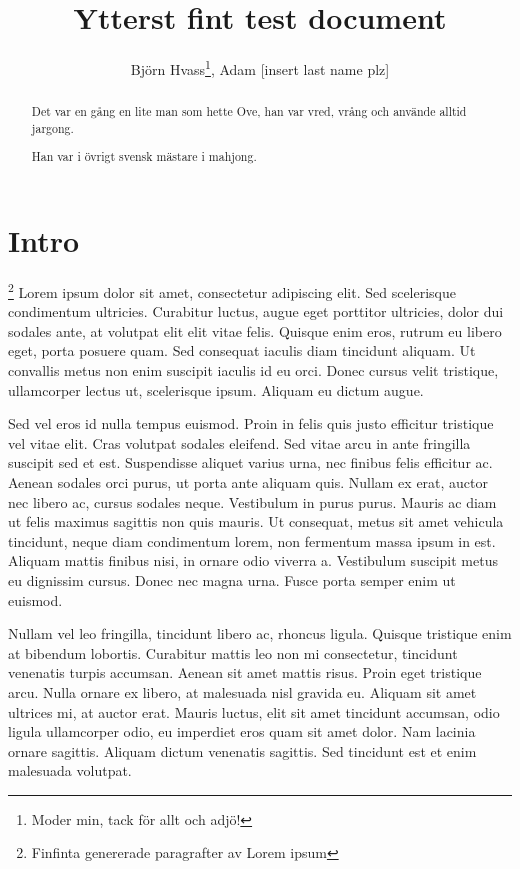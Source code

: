 \documentclass[a4paper,10pt]{article}
\title{Ytterst fint test document}
\author{Björn Hvass\thanks{Moder min, tack för allt och adjö!}, Adam [insert last name plz]}
\begin{document}
\maketitle

\begin{abstract}
  Det var en gång en lite man som hette Ove, han var vred, vrång och använde alltid jargong.

  Han var i övrigt svensk mästare i mahjong.
\end{abstract}

\section{Intro}\footnote{Finfinta genererade paragrafter av Lorem ipsum}\label{sec:Intro}
Lorem ipsum dolor sit amet, consectetur adipiscing elit. Sed scelerisque condimentum ultricies. Curabitur luctus, augue eget porttitor ultricies, dolor dui sodales ante, at volutpat elit elit vitae felis. Quisque enim eros, rutrum eu libero eget, porta posuere quam. Sed consequat iaculis diam tincidunt aliquam. Ut convallis metus non enim suscipit iaculis id eu orci. Donec cursus velit tristique, ullamcorper lectus ut, scelerisque ipsum. Aliquam eu dictum augue.

Sed vel eros id nulla tempus euismod. Proin in felis quis justo efficitur tristique vel vitae elit. Cras volutpat sodales eleifend. Sed vitae arcu in ante fringilla suscipit sed et est. Suspendisse aliquet varius urna, nec finibus felis efficitur ac. Aenean sodales orci purus, ut porta ante aliquam quis. Nullam ex erat, auctor nec libero ac, cursus sodales neque. Vestibulum in purus purus. Mauris ac diam ut felis maximus sagittis non quis mauris. Ut consequat, metus sit amet vehicula tincidunt, neque diam condimentum lorem, non fermentum massa ipsum in est. Aliquam mattis finibus nisi, in ornare odio viverra a. Vestibulum suscipit metus eu dignissim cursus. Donec nec magna urna. Fusce porta semper enim ut euismod.

Nullam vel leo fringilla, tincidunt libero ac, rhoncus ligula. Quisque tristique enim at bibendum lobortis. Curabitur mattis leo non mi consectetur, tincidunt venenatis turpis accumsan. Aenean sit amet mattis risus. Proin eget tristique arcu. Nulla ornare ex libero, at malesuada nisl gravida eu. Aliquam sit amet ultrices mi, at auctor erat. Mauris luctus, elit sit amet tincidunt accumsan, odio ligula ullamcorper odio, eu imperdiet eros quam sit amet dolor. Nam lacinia ornare sagittis. Aliquam dictum venenatis sagittis. Sed tincidunt est et enim malesuada volutpat.
\end{document}

